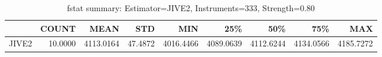 \begin{table}[ht]
\centering
\caption{fstat summary: Estimator=JIVE2, Instruments=333, Strength=0.80}
\begin{tabular}{lrrrrrrrr}
\toprule
 & COUNT & MEAN & STD & MIN & 25\% & 50\% & 75\% & MAX \\
\midrule
JIVE2 & 10.0000 & 4113.0164 & 47.4872 & 4016.4466 & 4089.0639 & 4112.6244 & 4134.0566 & 4185.7272 \\
\bottomrule
\end{tabular}
\end{table}
